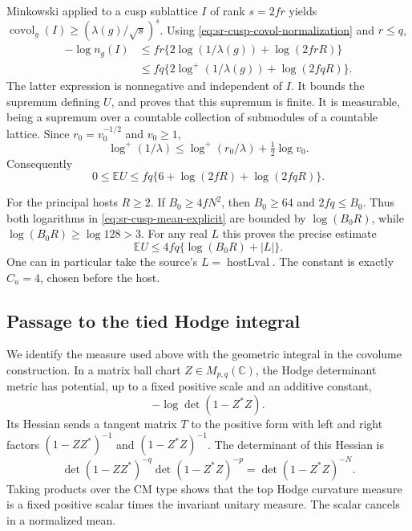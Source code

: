 Minkowski applied to a cusp sublattice \(I\) of rank
\(s=2fr\) yields
\(\operatorname{covol}_g(I)\ge
(\lambda(g)/\sqrt s)^s\).
Using \eqref{eq:sr-cusp-covol-normalization} and \(r\le q\),
\[
 \begin{split}
 -\log n_g(I)
   &\le fr\{2\log(1/\lambda(g))+\log(2frR)\}\\
   &\le fq\{2\log^+(1/\lambda(g))+\log(2fqR)\}.
 \end{split}
\]
The latter expression is nonnegative and independent of \(I\).
It bounds the supremum defining \(U\), and proves that
this supremum is finite.
It is measurable, being a supremum over a countable
collection of submodules of a countable lattice.
Since \(r_0=v_0^{-1/2}\) and \(v_0\ge1\),
\[
          \log^+(1/\lambda)
             \le\log^+(r_0/\lambda)+\tfrac12\log v_0 .
\]
Consequently
\begin{equation}\label{eq:sr-cusp-mean-explicit}
         0\le\mathbb E U
           \le fq\{6+\log(2fR)+\log(2fqR)\}.
\end{equation}

For the principal hosts \(R\ge2\).
If \(B_0\ge4fN^2\), then \(B_0\ge64\) and \(2fq\le B_0\).
Thus both logarithms in
\eqref{eq:sr-cusp-mean-explicit} are bounded by
\(\log(B_0R)\), while \(\log(B_0R)\ge\log128>3\).
For any real \(L\) this proves the precise estimate
\begin{equation}\label{eq:sr-cusp-mean-four}
       \mathbb E U
           \le4fq\{\log(B_0R)+|L|\}.
\end{equation}
One can in particular take the source's \(L=\operatorname{hostLval}\).
The constant is exactly \(C_u=4\), chosen before the host.

\subsection{Passage to the tied Hodge integral}

We identify the measure used above with the geometric
integral in the covolume construction.
In a matrix ball chart \(Z\in M_{p,q}(\mathbb C)\), the
Hodge determinant metric has potential, up to a fixed
positive scale and an additive constant,
\[
                         -\log\det(1-Z^*Z).
\]
Its Hessian sends a tangent matrix \(T\) to the positive
form with left and right factors
\((1-ZZ^*)^{-1}\) and \((1-Z^*Z)^{-1}\).
The determinant of this Hessian is
\[
 \det(1-ZZ^*)^{-q}\det(1-Z^*Z)^{-p}
                   =\det(1-Z^*Z)^{-N}.
\]
Taking products over the CM type shows that the top
Hodge curvature measure is a fixed positive scalar
times the invariant unitary measure.
The scalar cancels in a normalized mean.

